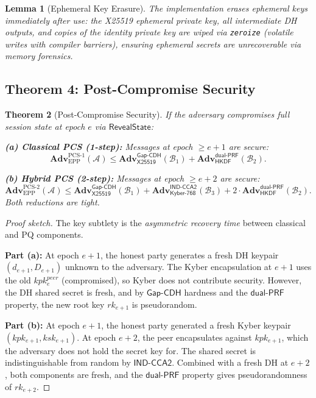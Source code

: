 \documentclass[11pt,a4paper]{article}
\newtheorem{theorem}{Theorem}[section]
\newtheorem{lemma}[theorem]{Lemma}
\theoremstyle{definition}
\newcommand{\adv}{\mathbf{Adv}}
\newcommand{\advA}{\mathcal{A}}
\newcommand{\advB}{\mathcal{B}}
\newcommand{\HKDF}{\textsf{HKDF}}
\newcommand{\DH}{\textsf{X25519}}
\newcommand{\KEM}{\textsf{Kyber-768}}
\newcommand{\GapCDH}{\textsf{Gap-CDH}}
\newcommand{\INDCCA}{\textsf{IND-CCA2}}
\newcommand{\dualPRF}{\textsf{dual-PRF}}
\newcommand{\rk}{\mathit{rk}}
\begin{document}
\begin{lemma}[Ephemeral Key Erasure]\label{lem:erasure}
The implementation erases ephemeral keys immediately after use: the X25519 ephemeral private key, all intermediate DH outputs, and copies of the identity private key are wiped via \texttt{zeroize} (volatile writes with compiler barriers), ensuring ephemeral secrets are unrecoverable via memory forensics.
\end{lemma}

\subsection{Theorem 4: Post-Compromise Security}\label{sec:thm-pcs}

\begin{theorem}[Post-Compromise Security]\label{thm:pcs}
If the adversary compromises full session state at epoch $e$ via $\textsf{RevealState}$:

\noindent\textbf{(a) Classical PCS (1-step):} Messages at epoch $\geq e+1$ are secure:
\[
  \adv^{\mathrm{PCS}\text{-}1}_{\mathrm{EPP}}(\advA) \leq \adv^{\GapCDH}_{\DH}(\advB_1) + \adv^{\dualPRF}_{\HKDF}(\advB_2).
\]

\noindent\textbf{(b) Hybrid PCS (2-step):} Messages at epoch $\geq e+2$ are secure:
\[
  \adv^{\mathrm{PCS}\text{-}2}_{\mathrm{EPP}}(\advA) \leq \adv^{\GapCDH}_{\DH}(\advB_1) + \adv^{\INDCCA}_{\KEM}(\advB_3) + 2 \cdot \adv^{\dualPRF}_{\HKDF}(\advB_2).
\]
Both reductions are \emph{tight}.
\end{theorem}

\begin{proof}[Proof sketch]
The key subtlety is the \emph{asymmetric recovery time} between classical and PQ components.

\textbf{Part (a):} At epoch $e+1$, the honest party generates a fresh DH keypair $(d_{e+1}, D_{e+1})$ unknown to the adversary. The Kyber encapsulation at $e+1$ uses the old $kpk_e^{\mathit{peer}}$ (compromised), so Kyber does not contribute security. However, the DH shared secret is fresh, and by $\GapCDH$ hardness and the $\dualPRF$ property, the new root key $\rk_{e+1}$ is pseudorandom.

\textbf{Part (b):} At epoch $e+1$, the honest party generated a fresh Kyber keypair $(kpk_{e+1}, ksk_{e+1})$. At epoch $e+2$, the peer encapsulates against $kpk_{e+1}$, which the adversary does not hold the secret key for. The shared secret is indistinguishable from random by $\INDCCA$. Combined with a fresh DH at $e+2$, both components are fresh, and the $\dualPRF$ property gives pseudorandomness of $\rk_{e+2}$.
\end{proof}
\end{document}
